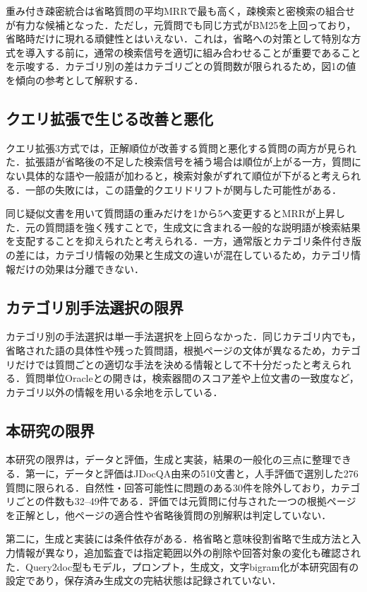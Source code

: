 \documentclass[twocolumn,a4paper,10pt]{ltjsarticle}
\begin{document}
重み付き疎密統合は省略質問の平均MRRで最も高く，疎検索と密検索の組合せが有力な候補となった．ただし，元質問でも同じ方式がBM25を上回っており，省略時だけに現れる頑健性とはいえない．これは，省略への対策として特別な方式を導入する前に，通常の検索信号を適切に組み合わせることが重要であることを示唆する．カテゴリ別の差はカテゴリごとの質問数が限られるため，図1の値を傾向の参考として解釈する．

\subsection{クエリ拡張で生じる改善と悪化}
クエリ拡張3方式では，正解順位が改善する質問と悪化する質問の両方が見られた．拡張語が省略後の不足した検索信号を補う場合は順位が上がる一方，質問にない具体的な語や一般語が加わると，検索対象がずれて順位が下がると考えられる．一部の失敗には，この語彙的クエリドリフトが関与した可能性がある．

同じ疑似文書を用いて質問語の重みだけを1から5へ変更するとMRRが上昇した．元の質問語を強く残すことで，生成文に含まれる一般的な説明語が検索結果を支配することを抑えられたと考えられる．一方，通常版とカテゴリ条件付き版の差には，カテゴリ情報の効果と生成文の違いが混在しているため，カテゴリ情報だけの効果は分離できない．

\subsection{カテゴリ別手法選択の限界}
カテゴリ別の手法選択は単一手法選択を上回らなかった．同じカテゴリ内でも，省略された語の具体性や残った質問語，根拠ページの文体が異なるため，カテゴリだけでは質問ごとの適切な手法を決める情報として不十分だったと考えられる．質問単位Oracleとの開きは，検索器間のスコア差や上位文書の一致度など，カテゴリ以外の情報を用いる余地を示している．

\subsection{本研究の限界}
本研究の限界は，データと評価，生成と実装，結果の一般化の三点に整理できる．第一に，データと評価はJDocQA由来の510文書と，人手評価で選別した276質問に限られる．自然性・回答可能性に問題のある30件を除外しており，カテゴリごとの件数も32--49件である．評価では元質問に付与された一つの根拠ページを正解とし，他ページの適合性や省略後質問の別解釈は判定していない．

第二に，生成と実装には条件依存がある．格省略と意味役割省略で生成方法と入力情報が異なり，追加監査では指定範囲以外の削除や回答対象の変化も確認された．Query2doc型もモデル，プロンプト，生成文，文字bigram化が本研究固有の設定であり，保存済み生成文の完結状態は記録されていない．
\end{document}

